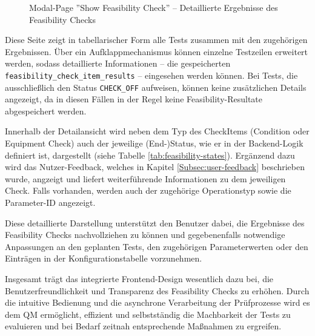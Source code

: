 \begin{figure}[!htbp] 
    \centering 
    \caption{Modal-Page ''Show Feasibility Check'' – Detaillierte Ergebnisse des Feasibility Checks} 
    \label{fig:result-details} 
\end{figure}

Diese Seite zeigt in tabellarischer Form alle Tests zusammen mit den zugehörigen Ergebnissen. Über ein Aufklappmechanismus können einzelne Testzeilen erweitert werden, sodass detaillierte Informationen – die gespeicherten \texttt{feasibility\_check\_item\_results} – eingesehen werden können. Bei Tests, die ausschließlich den Status \texttt{CHECK\_OFF} aufweisen, können keine zusätzlichen Details angezeigt, da in diesen Fällen in der Regel keine Feasibility-Resultate abgespeichert werden.

Innerhalb der Detailansicht wird neben dem Typ des CheckItems (Condition oder Equipment Check) auch der jeweilige (End-)Status, wie er in der Backend-Logik definiert ist, dargestellt (siehe Tabelle \ref{tab:feasibility-states}). Ergänzend dazu wird das Nutzer-Feedback, welches in Kapitel \ref{Subsec:user-feedback} beschrieben wurde, angzeigt und liefert weiterführende Informationen zu dem jeweiligen Check. Falls vorhanden, werden auch der zugehörige Operationstyp sowie die Parameter-ID angezeigt.

Diese detaillierte Darstellung unterstützt den Benutzer dabei, die Ergebnisse des Feasibility Checks nachvollziehen zu können und gegebenenfalls notwendige Anpassungen an den geplanten Tests, den zugehörigen Parameterwerten oder den Einträgen in der Konfigurationstabelle vorzunehmen.

Insgesamt trägt das integrierte Frontend-Design wesentlich dazu bei, die Benutzerfreundlichkeit und Transparenz des Feasibility Checks zu erhöhen. Durch die intuitive Bedienung und die asynchrone Verarbeitung der Prüfprozesse wird es dem \gls{QM} ermöglicht, effizient und selbstständig die Machbarkeit der Tests zu evaluieren und bei Bedarf zeitnah entsprechende Maßnahmen zu ergreifen.


